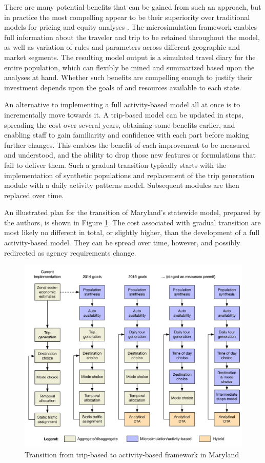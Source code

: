 There are many potential benefits that can be gained from such an approach, but in practice the most compelling appear to be their superiority over traditional models for pricing and equity analyses \citep{donnelly10}. The microsimulation framework enables full information about the traveler and trip to be retained throughout the model, as well as variation of rules and parameters across different geographic and market segments. The resulting model output is a simulated travel diary for the entire population, which can flexibly be mined and summarized based upon the analyses at hand. Whether such benefits are compelling enough to justify their investment depends upon the goals of and resources available to each state.

An alternative to implementing a full activity-based model all at once is to incrementally move towards it. A trip-based model can be updated in steps, spreading the cost over several years, obtaining some benefits earlier, and enabling staff to gain familiarity and confidence with each part before making further changes. This enables the benefit of each improvement to be measured and understood, and the ability to drop those new features or formulations that fail to deliver them. Such a gradual transition typically starts with the implementation of synthetic populations and replacement of the trip generation module with a daily activity patterns model. Subsequent modules are then replaced over time.

An illustrated plan for the transition of Maryland's statewide model, prepared by the authors, is shown in Figure \ref{fig:maryland-evolution}. The cost associated with gradual transition are most likely no different in total, or slightly higher, than the development of a full activity-based model. They can be spread over time, however, and possibly redirected as agency requirements change.

\begin{figure}[!t]
\centering
\includegraphics[width=6.5in]{graphics/44-maryland-model-evolution}
\caption{Transition from trip-based to activity-based framework in Maryland}
\label{fig:maryland-evolution}
\end{figure}

